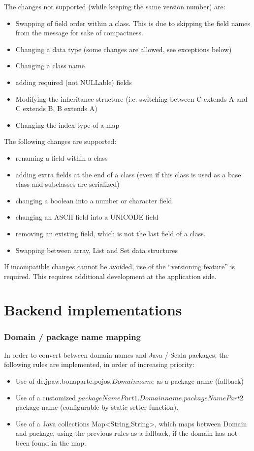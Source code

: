 \documentclass[11pt,a4paper,oneside]{article}
\begin{document}
The changes not supported (while keeping the same version number) are:
\begin{itemize}
    \item Swapping of field order within a class. This is due to skipping the field names from the message for sake of
    compactness.
    \item Changing a data type (some changes are allowed, see exceptions below)
    \item Changing a class name
    \item adding required (not NULLable) fields
    \item Modifying the inheritance structure (i.e. switching between C extends A and C extends B, B extends A)
    \item Changing the index type of a map
\end{itemize}

The following changes are supported:
\begin{itemize}
    \item renaming a field within a class
    \item adding extra fields at the end of a class (even if this class is used as a base class and subclasses are serialized)
    \item changing a boolean into a number or character field
    \item changing an ASCII field into a UNICODE field
    \item removing an existing field, which is not the last field of a class.
    \item Swapping between array, List and Set data structures 
\end{itemize}

If incompatible changes cannot be avoided, use of the ``versioning feature'' is required. This requires additional development
at the application side.







\section{Backend implementations}

\subsubsection{Domain / package name mapping}
In order to convert between domain names and Java / Scala packages, the following rules are implemented, in order of increasing
priority:
\begin{itemize}
    \item Use of {\ttfamily de.jpaw.bonaparte.pojos.}$Domainname$ as a package name (fallback)
    \item Use of a customized $packageNamePart1$.$Domainname$.$packageNamePart2$ package name (configurable by static setter
    function).
    \item Use of a Java collections {\ttfamily Map<String,String>}, which maps between Domain and package, using the previous rules as a
    fallback, if the domain has not been found in the map.
\end{itemize}
\end{document}
